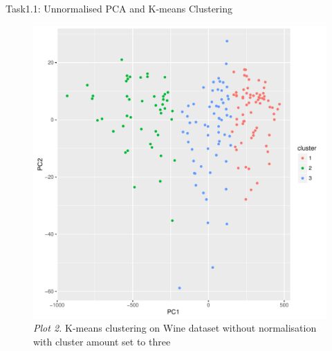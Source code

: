 \documentclass[11pt]{article}
\begin{document}
\begin{subsection}{Task1.1: Unnormalised PCA and K-means Clustering}
\begin{figure}[H]
    \centering
    \includegraphics[width=1.0\textwidth]{p2_un}
    \caption{\textit{Plot 2.} K-means clustering on Wine dataset without normalisation with cluster amount set to three}
\end{figure}


\end{subsection}
\end{document}
